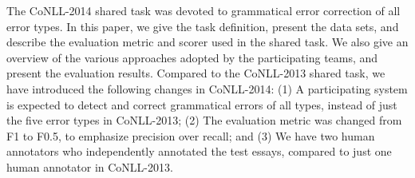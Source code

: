 The CoNLL-2014 shared task was devoted to grammatical error correction of all error types. In this paper, we give the task definition, present the data sets, and describe the evaluation metric and scorer used in the shared task. We also give an overview of the various approaches adopted by the participating teams, and present the evaluation results. Compared to the CoNLL-2013 shared task, we have introduced the following changes in CoNLL-2014: (1) A participating system is expected to detect and correct grammatical errors of all types, instead of just the five error types in CoNLL-2013; (2) The evaluation metric was changed from F1 to F0.5, to emphasize precision over recall; and (3) We have two human annotators who independently annotated the test essays, compared to just one human annotator in CoNLL-2013.
